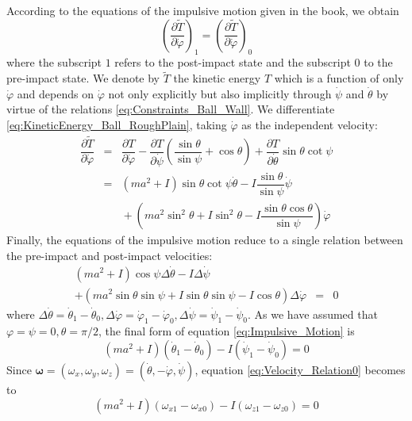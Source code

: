\documentclass[preprint,12pt]{elsarticle}
\renewcommand{\vec}[1]{\boldsymbol{#1}}
\begin{document}
According to the equations of the impulsive motion given in the book\cite{Neimark}, we obtain
\begin{equation}
  \left(\frac{\partial \tilde{T}}{\partial \dot{\varphi}}\right)_1= \left(\frac{\partial \tilde{T}}{\partial \dot{\varphi}}\right)_0
\end{equation}
where the subscript $1$ refers to the post-impact state and the subscript $0$ to the pre-impact state. We denote by $\tilde{T}$ the kinetic energy $T$ which is a function of only $\dot{\varphi}$ and depends on $\dot{\varphi}$ not only explicitly but also implicitly through $\dot{\psi}$ and $\dot{\theta}$ by virtue of the relations \eqref{eq:Constraints_Ball_Wall}.
We differentiate \eqref{eq:KineticEnergy_Ball_RoughPlain}, taking $\dot{\varphi}$ as the independent velocity:
\begin{equation}
\begin{array}{rcl}
  \dfrac{\partial \tilde{T}}{\partial \dot{\varphi}}&=&\dfrac{\partial {T}}{\partial \dot{\varphi}}-\dfrac{\partial {T}}{\partial \dot{\psi}}\left(\dfrac{\sin \theta }{\sin \psi } + \cos \theta \right)+\dfrac{\partial {T}}{\partial \dot{\theta}}\sin \theta \cot \psi\\
  &= &\left(m a^2+I\right)\sin \theta \cot \psi \dot{\theta}-I\dfrac{\sin\theta}{\sin \psi}\dot{\psi} \\[12pt]
  & &{}+\left(m a^2 \sin^2 \theta+I \sin^2 \theta-I\dfrac{\sin \theta \cos \theta}{\sin \psi}\right)\dot{\varphi}
\end{array}
\end{equation}
Finally, the equations of the impulsive motion reduce to a single relation between the pre-impact and post-impact velocities:
\begin{equation}
\begin{array}{lrl}\label{eq:Impulsive_Motion}
  \left(m a^2+I\right)\cos\psi \Delta\dot{\theta}-I\Delta\dot{\psi}& &\\[12pt]
  +\left(ma^2\sin\theta \sin\psi+I\sin\theta \sin\psi-I\cos\theta\right)\Delta\dot{\varphi}&=&0
\end{array}
\end{equation}
where $\Delta\dot{\theta}=\dot{\theta}_1-\dot{\theta}_0,\Delta\dot{\varphi}=\dot{\varphi}_1-\dot{\varphi}_0,\Delta\dot{\psi}=\dot{\psi}_1-\dot{\psi}_0$.
As we have assumed that $\varphi=\psi=0, \theta=\pi/2$, the final form of equation \eqref{eq:Impulsive_Motion} is
\begin{equation}\label{eq:Velocity_Relation0}
   \left(m a^2+I\right)\left(\dot{\theta}_1-\dot{\theta}_0\right)-I\left(\dot{\psi}_1-\dot{\psi}_0\right)=0
\end{equation}
Since $\vec{\omega}=(\omega_x,\omega_y,\omega_z)=(\dot{\theta},-\dot{\varphi},\dot{\psi})$, equation \eqref{eq:Velocity_Relation0} becomes to
 \begin{equation}\label{eq:Velocity_Relation}
   \left(ma^2+I\right)\left(\omega_{x1}-\omega_{x0}\right)-I\left(\omega_{z1}-\omega_{z0}\right)=0
 \end{equation}
\end{document}
